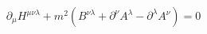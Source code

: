 \begin{equation}
\partial_\mu H^{\mu\nu\lambda} + m^2 (B^{\nu\lambda} + \partial^\nu A^\lambda
- \partial^\lambda  A^\nu ) = 0 
\label{n4}
\end{equation}

